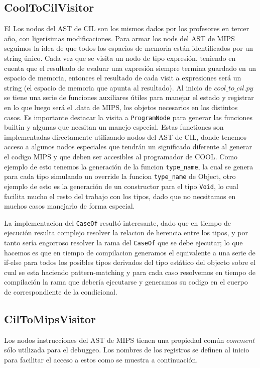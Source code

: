 \documentclass[a4paper,12pt]{article}
\def\code#1{\texttt{#1}}
\begin{document}
\subsection*{CoolToCilVisitor}
El Los nodos del AST de CIL son los mismos dados por los profesores en tercer año, con ligerísimas modificaciones. Para armar los nods del AST de MIPS seguimos la idea de que todos los espacios de memoria están identificados por un string único. Cada vez que se visita un nodo de tipo expresión, teniendo en cuenta que el resultado de evaluar una expresión siempre termina guardado en un espacio de memoria, entonces el resultado de cada visit a expresiones será un string (el espacio de memoria que apunta al resultado). Al inicio de $cool\_to\_cil.py$ se tiene una serie de funciones auxiliares útiles para manejar el estado y registrar en lo que luego será el .data de MIPS, los objetos necesarios en los distintos casos.
Es importante destacar la visita a \code{ProgramNode} para generar las funciones builtin y algunas que necsitan un manejo especial. Estas functiones son implementadas directamente utilizando nodos del AST de CIL, donde tenemos acceso a algunos nodos especiales que tendrán un significado diferente al generar el codigo MIPS y que deben ser accesibles al programador de COOL. Como ejemplo de esto tenemos la generación de la funcion \code{type\_name}, la cual se genera para cada tipo simulando un override la funcion \code{type\_name} de Object, otro ejemplo de esto es la generación de un constructor para el tipo \code{Void}, lo cual facilita mucho el resto del trabajo con los tipos, dado que no necsitamos en muchos casos manejarlo de forma especial.

La implementacion del \code{CaseOf} resultó interesante, dado que en tiempo de ejecución resulta complejo resolver la relacion de herencia entre los tipos, y por tanto sería engorroso resolver la rama del \code{CaseOf} que se debe ejecutar; lo que hacemos es que en tiempo de compilacion generamos el equivalente a una serie de if-else para todos los posibles tipos derivados del tipo estático del objecto sobre el cual se esta haciendo pattern-matching y para cada caso resolvemos en tiempo de compilación la rama que debería ejecutarse y generamos su codigo en el cuerpo de correspondiente de la condicional.


\subsection*{CilToMipsVisitor}
Los nodos instrucciones del AST de MIPS tienen una propiedad común $comment$ sólo utilizada para el debuggeo. Los nombres de los registros se definen al inicio para facilitar el acceso a estos como se muestra a continuación.
\end{document}
